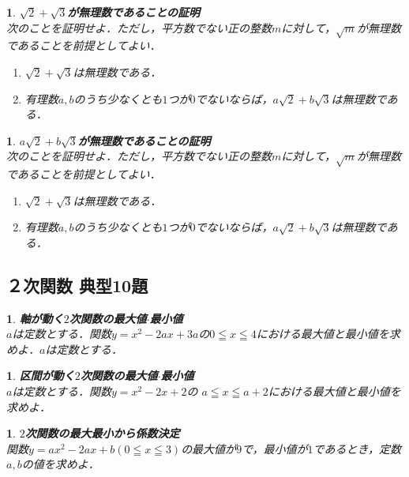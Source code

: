 \documentclass[10pt,
fleqn,
dvipdfmx,
uplatex
]{jsarticle}
\newtheorem{question}[Question]{}
\begin{document}
\begin{question}{\bf\boldmath $\sqrt 2+\sqrt 3$が無理数であることの証明}\\
次のことを証明せよ．ただし，平方数でない正の整数$m$に対して，$\sqrt m$が無理数であることを前提としてよい．
\begin{enumerate}
\item $\sqrt 2+\sqrt 3$は無理数である．
\item 有理数$a, b$のうち少なくとも$1$つが$0$でないならば，$a\sqrt 2+b\sqrt 3$は無理数である．
\end{enumerate}

\end{question}



\begin{question}{\bf\boldmath $a\sqrt 2+b\sqrt 3$が無理数であることの証明}\\
次のことを証明せよ．ただし，平方数でない正の整数$m$に対して，$\sqrt m$が無理数であることを前提としてよい．
\begin{enumerate}
\item $\sqrt 2+\sqrt 3$は無理数である．
\item 有理数$a, b$のうち少なくとも$1$つが$0$でないならば，$a\sqrt 2+b\sqrt 3$は無理数である．
\end{enumerate}

\end{question}

\subsection{２次関数 典型10題}



\begin{question}{\bf\boldmath 軸が動く$2$次関数の最大値$\cdot$最小値}\\
$a$は定数とする．関数$y=x^2-2ax+3a$の$0\leqq x\leqq 4$における最大値と最小値を求めよ．$a$は定数とする．
\end{question}



\begin{question}{\bf\boldmath 区間が動く$2$次関数の最大値$\cdot$最小値}\\
$a$は定数とする．関数$y=x^2-2x+2$の
$a\leqq x\leqq a+2$における最大値と最小値を求めよ．
\end{question}



\begin{question}{\bf\boldmath $2$次関数の最大最小から係数決定}\\
関数$y=ax^2-2ax+b\left(0\leqq x\leqq 3\right)$の最大値が$9$で，最小値が$1$であるとき，定数$a, b$の値を求めよ．
\end{question}
\end{document}
